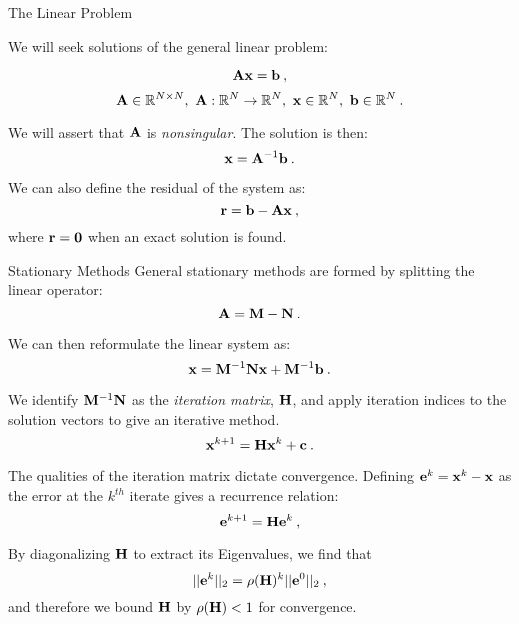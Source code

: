 \documentclass{beamer}
\begin{document}
\begin{frame}{The Linear Problem}

  We will seek solutions of the general linear problem:

  \[
  \mathbf{A} \mathbf{x} = \mathbf{b}\:,
  \]
  \[
  \mathbf{A} \in \mathbb{R}^{N \times N},\ \mathbf{A} : \mathbb{R}^{N}
  \rightarrow \mathbb{R}^{N},\ \mathbf{x} \in \mathbb{R}^N,\ \mathbf{b} \in
  \mathbb{R}^N\:.
  \]

  We will assert that $\mathbf{A}$ is \textit{nonsingular}. The solution
  is then:
  \[
  \mathbf{x} = \mathbf{A}^{-1}\mathbf{b}\:.
  \]

  We can also define the residual of the system as:
  \[
  \mathbf{r} = \mathbf{b} - \mathbf{A}\mathbf{x}\:,
  \]
  where $\mathbf{r}=\mathbf{0}$ when an exact solution is found.

\end{frame}

\begin{frame}{Stationary Methods}
  General stationary methods are formed by splitting the linear
  operator:
  \[
  \mathbf{A} = \mathbf{M} - \mathbf{N}\:.
  \]

  We can then reformulate the linear system as:
  \[
  \mathbf{x} = \mathbf{M}^{-1}\mathbf{N}\mathbf{x} + \mathbf{M}^{-1}\mathbf{b}\:.
  \]

  We identify $\mathbf{M}^{-1}\mathbf{N}$ as the \textit{iteration matrix},
  $\mathbf{H}$, and apply iteration indices to the solution vectors to
  give an iterative method.
  \[
  \mathbf{x}^{k+1} = \mathbf{H}\mathbf{x}^{k} + \mathbf{c}\:.
  \]

  The qualities of the iteration matrix dictate convergence. Defining
  $\mathbf{e}^k = \mathbf{x}^k-\mathbf{x}$ as the error at the $k^{th}$ iterate
  gives a recurrence relation:
  \[
  \mathbf{e}^{k+1} = \mathbf{H} \mathbf{e}^k\:,
  \]
  
  By diagonalizing $\mathbf{H}$ to extract its Eigenvalues, we find that 
  \[
  ||\mathbf{e}^{k}||_2 = \rho(\mathbf{H})^k ||\mathbf{e}^0||_2\:,
  \]
  and therefore we bound $\mathbf{H}$ by $\rho(\mathbf{H}) < 1$ for convergence.

\end{frame}
\end{document}
